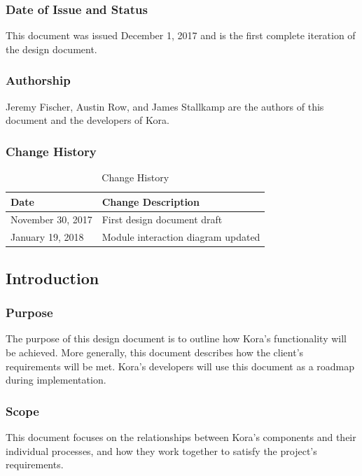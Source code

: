 \documentclass[onecolumn, draftclsnofoot,10pt, compsoc]{IEEEtran}
\def \botname{Kora\xspace}
\begin{document}
	\subsubsection{Date of Issue and Status}
	This document was issued December 1, 2017 and is the first complete iteration of the design document.

	\subsubsection{Authorship}
	Jeremy Fischer, Austin Row, and James Stallkamp are the authors of this document and the developers of \botname.

	\subsubsection{Change History}
	\begin{table}[H]
		\centering
		\caption{Change History}
		\label{my-label}
		\begin{tabular}{|l|l|}
			\hline
			\textbf{Date}     & \textbf{Change Description}   \\ \hline
			November 30, 2017 & {First design document draft} \\ \hline
			January 19, 2018 & {Module interaction diagram updated} \\ \hline
		\end{tabular}
	\end{table}

	\subsection{Introduction}
	\subsubsection{Purpose}
	The purpose of this design document is to outline how \botname's functionality will be achieved.
	More generally, this document describes how the client's requirements will be met.
	\botname's developers will use this document as a roadmap during implementation.

	\subsubsection{Scope}
	This document focuses on the relationships between \botname's components and their individual processes, and how they work together to satisfy the project's requirements.
\end{document}
